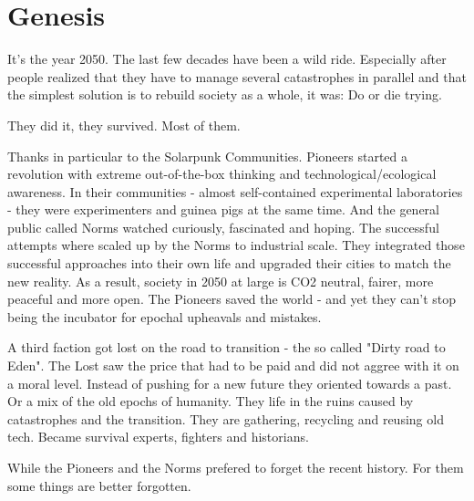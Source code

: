 \chapter{Genesis}

It's the year 2050. The last few decades have been a wild ride. Especially after people realized that they have to manage several catastrophes in parallel and that the simplest solution is to rebuild society as a whole, it was: Do or die trying.

They did it, they survived. Most of them.

Thanks in particular to the Solarpunk Communities. Pioneers started a revolution with extreme out-of-the-box thinking and technological/ecological awareness. In their communities - almost self-contained experimental laboratories - they were experimenters and guinea pigs at the same time. And the general public called Norms watched curiously, fascinated and hoping. The successful attempts where scaled up by the Norms to industrial scale. They integrated those successful approaches into their own life and upgraded their cities to match the new reality.
As a result, society in 2050 at large is CO2 neutral, fairer, more peaceful and more open.
The Pioneers saved the world - and yet they can't stop being the incubator for epochal upheavals and mistakes.

A third faction got lost on the road to transition - the so called "Dirty road to Eden". The Lost saw the price that had to be paid and did not aggree with it on a moral level. Instead of pushing for a new future they oriented towards a past. Or a mix of the old epochs of humanity. They life in the ruins caused by catastrophes and the transition. They are gathering, recycling and reusing old tech. Became survival experts, fighters and historians.

While the Pioneers and the Norms prefered to forget the recent history. For them some things are better forgotten.